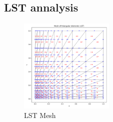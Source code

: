 \subsection{LST annalysis}

\begin{figure}[H]
\centering
\includegraphics[width=0.4\textwidth]{GRAFICOS/LST/LST_mesh_plot.png}
\caption{LST Mesh}
\label{fig:lst_results}
\end{figure}

